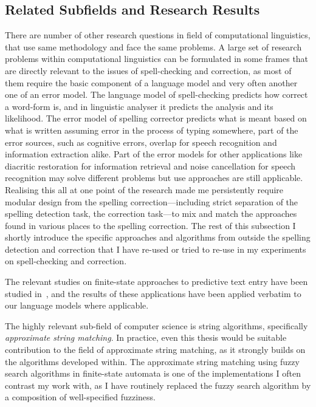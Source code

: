 \documentclass[officiallayout,draft]{unihelcompling}
\begin{document}
\subsection{Related Subfields and Research Results}


There are number of other research questions in field of computational
linguistics, that use same methodology and face the same problems. A large set
of research problems within computational linguistics can be formulated in some
frames that are directly relevant to the issues of spell-checking and
correction, as most of them require the basic component of a language model and
very often another one of an error model. The language model of spell-checking
predicts how correct a word-form is, and in linguistic analyser it predicts the
analysis and its likelihood. The error model of spelling corrector predicts
what is meant based on what is written assuming error in the process of typing
somewhere, part of the error sources, such as cognitive errors, overlap for
speech recognition and information extraction alike. Part of the error models
for other applications like diacritic restoration for information retrieval and
noise cancellation for speech recognition may solve different problems but use
approaches are still applicable. Realising this all at one point of the
research made me persistently require modular design from the spelling
correction---including strict separation of the spelling detection task, the
correction task---to mix and match the approaches found in various places to
the spelling correction. The rest of this subsection I shortly introduce the
specific approaches and algorithms from outside the spelling detection and
correction that I have re-used or tried to re-use in my experiments on
spell-checking and correction.

The relevant studies on finite-state approaches to predictive text entry have
been studied in~\cite{silfverberg200x}, and the results of these applications
have been applied verbatim to our language models where applicable.

The highly relevant sub-field of computer science is string algorithms,
specifically \emph{approximate string matching}. In practice, even this
thesis would be suitable contribution to the field of approximate string
matching, as it strongly builds on the algorithms developed within. The
approximate string matching using fuzzy search algorithms in finite-state
automata is one of the implementations I often contrast my work with, as
I have routinely replaced the fuzzy search algorithm by a composition of
well-specified fuzziness.
\end{document}
